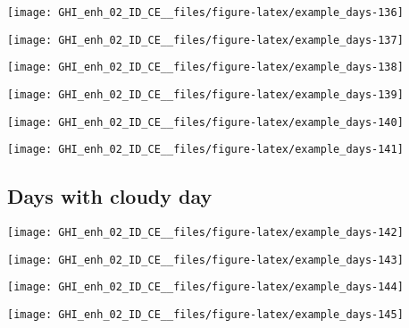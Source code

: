 \documentclass[
  10pt,
  a4paper,oneside]{article}
\begin{document}
\begin{center}\texttt{[image: GHI\_enh\_02\_ID\_CE\_\_files/figure-latex/example\_days-136]} \end{center}

\begin{center}\texttt{[image: GHI\_enh\_02\_ID\_CE\_\_files/figure-latex/example\_days-137]} \end{center}

\begin{center}\texttt{[image: GHI\_enh\_02\_ID\_CE\_\_files/figure-latex/example\_days-138]} \end{center}

\begin{center}\texttt{[image: GHI\_enh\_02\_ID\_CE\_\_files/figure-latex/example\_days-139]} \end{center}

\begin{center}\texttt{[image: GHI\_enh\_02\_ID\_CE\_\_files/figure-latex/example\_days-140]} \end{center}

\begin{center}\texttt{[image: GHI\_enh\_02\_ID\_CE\_\_files/figure-latex/example\_days-141]} \end{center}

\FloatBarrier

\hypertarget{days-with-cloudy-day}{%
\subsection{Days with cloudy day}\label{days-with-cloudy-day}}

\begin{center}\texttt{[image: GHI\_enh\_02\_ID\_CE\_\_files/figure-latex/example\_days-142]} \end{center}

\begin{center}\texttt{[image: GHI\_enh\_02\_ID\_CE\_\_files/figure-latex/example\_days-143]} \end{center}

\begin{center}\texttt{[image: GHI\_enh\_02\_ID\_CE\_\_files/figure-latex/example\_days-144]} \end{center}

\begin{center}\texttt{[image: GHI\_enh\_02\_ID\_CE\_\_files/figure-latex/example\_days-145]} \end{center}
\end{document}

